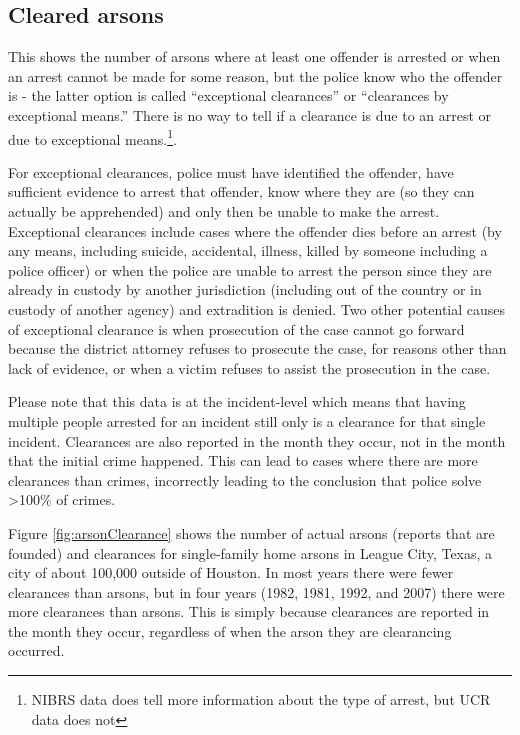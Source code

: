 \documentclass[
  12pt,
  openany]{book}
\begin{document}
\hypertarget{cleared-arsons}{%
\subsection{Cleared arsons}\label{cleared-arsons}}

This shows the number of arsons where at least one offender is arrested or when an arrest cannot be made for some reason, but the police know who the offender is - the latter option is called ``exceptional clearances'' or ``clearances by exceptional means.'' There is no way to tell if a clearance is due to an arrest or due to exceptional means.\footnote{NIBRS data does tell more information about the type of arrest, but UCR data does not}.

For exceptional clearances, police must have identified the offender, have sufficient evidence to arrest that offender, know where they are (so they can actually be apprehended) and only then be unable to make the arrest. Exceptional clearances include cases where the offender dies before an arrest (by any means, including suicide, accidental, illness, killed by someone including a police officer) or when the police are unable to arrest the person since they are already in custody by another jurisdiction (including out of the country or in custody of another agency) and extradition is denied. Two other potential causes of exceptional clearance is when prosecution of the case cannot go forward because the district attorney refuses to prosecute the case, for reasons other than lack of evidence, or when a victim refuses to assist the prosecution in the case.

Please note that this data is at the incident-level which means that having multiple people arrested for an incident still only is a clearance for that single incident. Clearances are also reported in the month they occur, not in the month that the initial crime happened. This can lead to cases where there are more clearances than crimes, incorrectly leading to the conclusion that police solve \textgreater100\% of crimes.

Figure \ref{fig:arsonClearance} shows the number of actual arsons (reports that are founded) and clearances for single-family home arsons in League City, Texas, a city of about 100,000 outside of Houston. In most years there were fewer clearances than arsons, but in four years (1982, 1981, 1992, and 2007) there were more clearances than arsons. This is simply because clearances are reported in the month they occur, regardless of when the arson they are clearancing occurred.
\end{document}
